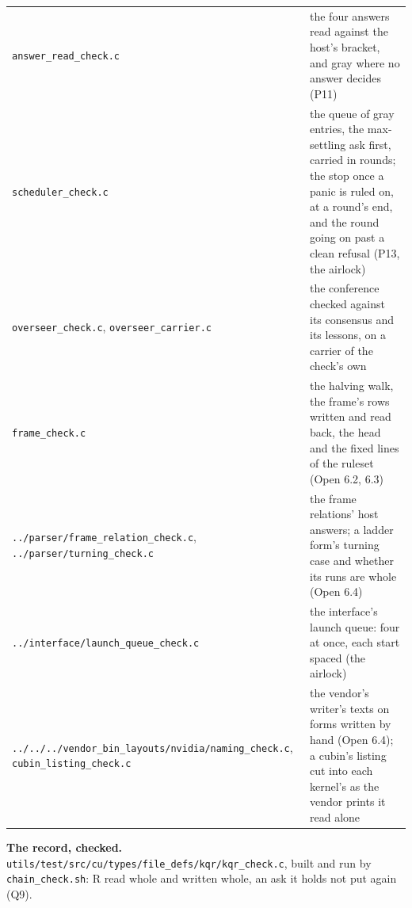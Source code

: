 {\begin{longtable}{>{\RaggedRight\arraybackslash}p{}>{\RaggedRight\arraybackslash}p{}}
\texttt{answer\_\allowbreak{}read\_\allowbreak{}check.\allowbreak{}c} & the four answers read against the host's bracket, and gray where no answer decides (P11) \\
\texttt{scheduler\_\allowbreak{}check.\allowbreak{}c} & the queue of gray entries, the max-settling ask first, carried in rounds; the stop once a panic is ruled on, at a round's end, and the round going on past a clean refusal (P13, the airlock) \\
\texttt{overseer\_\allowbreak{}check.\allowbreak{}c}, \texttt{overseer\_\allowbreak{}carrier.\allowbreak{}c} & the conference checked against its consensus and its lessons, on a carrier of the check's own \\
\texttt{frame\_\allowbreak{}check.\allowbreak{}c} & the halving walk, the frame's rows written and read back, the head and the fixed lines of the ruleset (Open 6.2, 6.3) \\
\texttt{.\allowbreak{}.\allowbreak{}/\allowbreak{}parser/\allowbreak{}frame\_\allowbreak{}relation\_\allowbreak{}check.\allowbreak{}c}, \texttt{.\allowbreak{}.\allowbreak{}/\allowbreak{}parser/\allowbreak{}turning\_\allowbreak{}check.\allowbreak{}c} & the frame relations' host answers; a ladder form's turning case and whether its runs are whole (Open 6.4) \\
\texttt{.\allowbreak{}.\allowbreak{}/\allowbreak{}interface/\allowbreak{}launch\_\allowbreak{}queue\_\allowbreak{}check.\allowbreak{}c} & the interface's launch queue: four at once, each start spaced (the airlock) \\
\texttt{.\allowbreak{}.\allowbreak{}/\allowbreak{}.\allowbreak{}.\allowbreak{}/\allowbreak{}.\allowbreak{}.\allowbreak{}/\allowbreak{}vendor\_\allowbreak{}bin\_\allowbreak{}layouts/\allowbreak{}nvidia/\allowbreak{}naming\_\allowbreak{}check.\allowbreak{}c}, \texttt{cubin\_\allowbreak{}listing\_\allowbreak{}check.\allowbreak{}c} & the vendor's writer's texts on forms written by hand (Open 6.4); a cubin's listing cut into each kernel's as the vendor prints it read alone \\
\bottomrule
\end{longtable}
}

\textbf{The record, checked.} \texttt{utils/\allowbreak{}test/\allowbreak{}src/\allowbreak{}cu/\allowbreak{}types/\allowbreak{}file\_\allowbreak{}defs/\allowbreak{}kqr/\allowbreak{}kqr\_\allowbreak{}check.\allowbreak{}c}, built and run by \texttt{chain\_\allowbreak{}check.\allowbreak{}sh}: R read whole and written whole, an ask it holds not put again (Q9).

